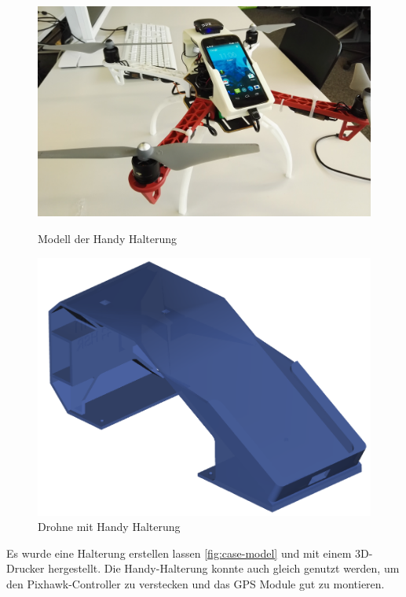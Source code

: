 \begin{figure}[H]
	\centering
	\begin{minipage}[b]{0.4\textwidth}
		\includegraphics[width=\textwidth]{images/hardware/drone-with-handy.jpg}
	\caption{Modell der Handy Halterung}
	\label{fig:case-model}
	\end{minipage}
	\hfill
	\begin{minipage}[b]{0.4\textwidth}
		\includegraphics[width=\textwidth]{images/hardware/case-model.png}
	\caption{Drohne mit Handy Halterung}
	\label{fig:prototyp-3}
	\end{minipage}
\end{figure}

Es wurde eine Halterung erstellen lassen \ref{fig:case-model} und mit einem 3D-Drucker hergestellt. 
Die Handy-Halterung konnte auch gleich genutzt werden, um den Pixhawk-Controller zu verstecken und das GPS Module gut zu montieren. 


